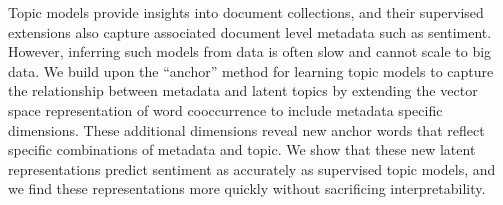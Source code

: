 Topic models provide insights into document collections, and their supervised extensions also capture associated document level metadata such as sentiment. However, inferring such models from data is often slow and cannot scale to big data.  We build upon the ``anchor'' method for learning topic models to capture the relationship between metadata and latent topics by extending the vector space representation of word cooccurrence to include metadata specific dimensions.  These additional dimensions reveal new anchor words that reflect specific combinations of metadata and topic.  We show that these new latent representations predict sentiment as accurately as supervised topic models, and we find these representations  more quickly without sacrificing interpretability.
